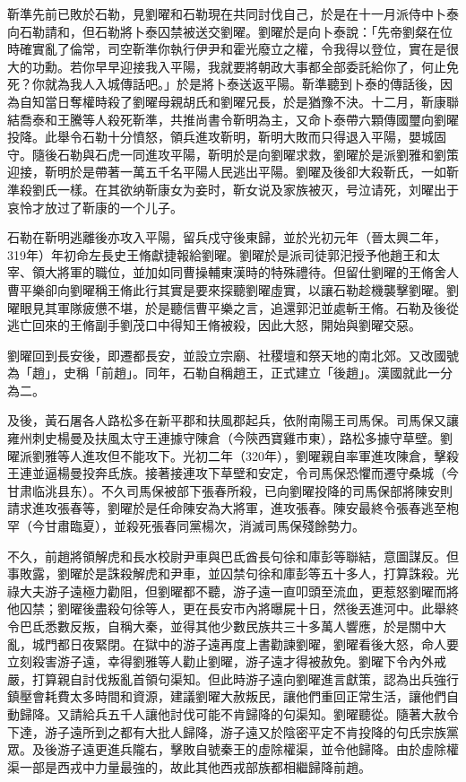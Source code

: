 靳準先前已敗於石勒，見劉曜和石勒現在共同討伐自己，於是在十一月派侍中卜泰向石勒請和，但石勒將卜泰囚禁被送交劉曜。劉曜於是向卜泰說：「先帝劉粲在位時確實亂了倫常，司空靳準你執行伊尹和霍光廢立之權，令我得以登位，實在是很大的功勳。若你早早迎接我入平陽，我就要將朝政大事都全部委託給你了，何止免死？你就為我人入城傳話吧。」於是將卜泰送返平陽。靳準聽到卜泰的傳話後，因為自知當日奪權時殺了劉曜母親胡氏和劉曜兄長，於是猶豫不決。十二月，靳康聯結喬泰和王騰等人殺死靳準，共推尚書令靳明為主，又命卜泰帶六顆傳國璽向劉曜投降。此舉令石勒十分憤怒，領兵進攻靳明，靳明大敗而只得退入平陽，嬰城固守。隨後石勒與石虎一同進攻平陽，靳明於是向劉曜求救，劉曜於是派劉雅和劉策迎接，靳明於是帶著一萬五千名平陽人民逃出平陽。劉曜及後卻大殺靳氏，一如靳準殺劉氏一樣。在其欲纳靳康女为妾时，靳女说及家族被灭，号泣请死，刘曜出于哀怜才放过了靳康的一个儿子。

石勒在靳明逃離後亦攻入平陽，留兵戍守後東歸，並於光初元年（晉太興二年，319年）年初命左長史王脩獻捷報給劉曜。劉曜於是派司徒郭汜授予他趙王和太宰、領大將軍的職位，並加如同曹操輔東漢時的特殊禮待。但留仕劉曜的王脩舍人曹平樂卻向劉曜稱王脩此行其實是要來探聽劉曜虛實，以讓石勒趁機襲擊劉曜。劉曜眼見其軍隊疲憊不堪，於是聽信曹平樂之言，追還郭汜並處斬王脩。石勒及後從逃亡回來的王脩副手劉茂口中得知王脩被殺，因此大怒，開始與劉曜交惡。

劉曜回到長安後，即遷都長安，並設立宗廟、社稷壇和祭天地的南北郊。又改國號為「趙」，史稱「前趙」。同年，石勒自稱趙王，正式建立「後趙」。漢國就此一分為二。

及後，黃石屠各人路松多在新平郡和扶風郡起兵，依附南陽王司馬保。司馬保又讓雍州刺史楊曼及扶風太守王連據守陳倉（今陝西寶雞市東），路松多據守草壁。劉曜派劉雅等人進攻但不能攻下。光初二年（320年），劉曜親自率軍進攻陳倉，擊殺王連並逼楊曼投奔氐族。接著接連攻下草壁和安定，令司馬保恐懼而遷守桑城（今甘肃临洮县东）。不久司馬保被部下張春所殺，已向劉曜投降的司馬保部將陳安則請求進攻張春等，劉曜於是任命陳安為大將軍，進攻張春。陳安最終令張春逃至枹罕（今甘肅臨夏），並殺死張春同黨楊次，消滅司馬保殘餘勢力。

不久，前趙將領解虎和長水校尉尹車與巴氐酋長句徐和庫彭等聯結，意圖謀反。但事敗露，劉曜於是誅殺解虎和尹車，並囚禁句徐和庫彭等五十多人，打算誅殺。光祿大夫游子遠極力勸阻，但劉曜都不聽，游子遠一直叩頭至流血，更惹怒劉曜而將他囚禁；劉曜後盡殺句徐等人，更在長安市內將曝屍十日，然後丟進河中。此舉終令巴氐悉數反叛，自稱大秦，並得其他少數民族共三十多萬人響應，於是關中大亂，城門都日夜緊閉。在獄中的游子遠再度上書勸諫劉曜，劉曜看後大怒，命人要立刻殺害游子遠，幸得劉雅等人勸止劉曜，游子遠才得被赦免。劉曜下令內外戒嚴，打算親自討伐叛亂首領句渠知。但此時游子遠向劉曜進言獻策，認為出兵強行鎮壓會耗費太多時間和資源，建議劉曜大赦叛民，讓他們重回正常生活，讓他們自動歸降。又請給兵五千人讓他討伐可能不肯歸降的句渠知。劉曜聽從。隨著大赦令下達，游子遠所到之都有大批人歸降，游子遠又於陰密平定不肯投降的句氏宗族黨眾。及後游子遠更進兵隴右，擊敗自號秦王的虛除權渠，並令他歸降。由於虛除權渠一部是西戎中力量最強的，故此其他西戎部族都相繼歸降前趙。

